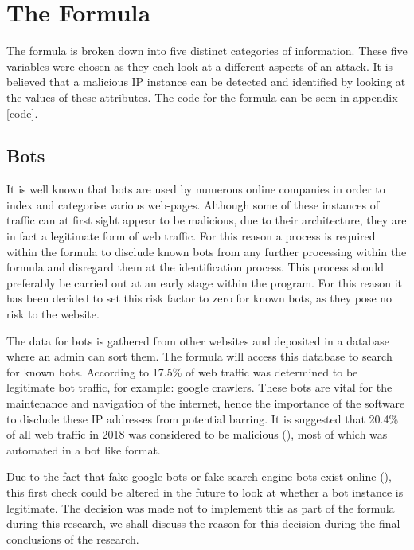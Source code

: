\section{The Formula} \label{The Formula}

The formula is broken down into five distinct categories of information. These five variables were chosen as they each look at a different aspects of an attack. It is believed that a malicious IP instance can be detected and identified by looking at the values of these attributes. The code for the formula can be seen in appendix \ref{code}.

\subsection{Bots}

It is well known that bots are used by numerous online companies in order to index and categorise various web-pages. Although some of these instances of traffic can at first sight appear to be malicious, due to their architecture, they are in fact a legitimate form of web traffic. For this reason a process is required within the formula to disclude known bots from any further processing within the formula and disregard them at the identification process. This process should preferably be carried out at an early stage within the program. For this reason it has been decided to set this risk factor to zero for known bots, as they pose no risk to the website.

The data for bots is gathered from other websites and deposited in a database where an admin can sort them. The formula will access this database to search for known bots. According to \citeauthor{Bots} 17.5\% of web traffic was determined to be legitimate bot traffic, for example: google crawlers. These bots are vital for the maintenance and navigation of the internet, hence the importance of the software to disclude these IP addresses from potential barring. It is suggested that 20.4\% of all web traffic in 2018 was considered to be malicious (\cite{Bots}), most of which was automated in a bot like format.

Due to the fact that fake google bots or fake search engine bots exist online (\cite{algiryage2018distinguishing}), this first check could be altered in the future to look at whether a bot instance is legitimate. The decision was made not to implement this as part of the formula during this research, we shall discuss the reason for this decision during the final conclusions of the research.


